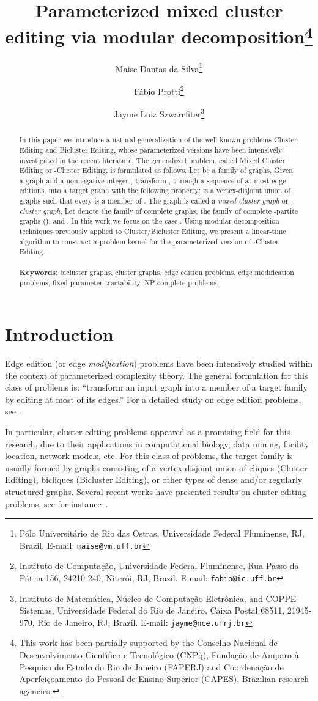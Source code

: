 \documentclass[12pt]{article}
\title{Parameterized mixed cluster editing via modular decomposition\footnote{This work has been partially supported by the
 Conselho Nacional de Desenvolvimento Cient\'{\i}fico e Tecnol\'{o}gico (CNPq), Funda\c c\~ao de Amparo \`a Pesquisa do
 Estado do Rio de Janeiro (FAPERJ) and Coordena\c c\~ao de Aperfei\c coamento do Pessoal de Ensino Superior (CAPES),
 Brazilian research agencies.}}
\author{Maise Dantas da Silva\footnote{P\'{o}lo Universit\'{a}rio de Rio das Ostras, Universidade Federal Fluminense, RJ, Brazil.
E-mail: {\tt maise@vm.uff.br}} \and F\'abio Protti\footnote{Instituto de Computa\c c\~ao, Universidade Federal Fluminense, Rua Passo da P\'{a}tria 156, 24210-240, Niter\'oi,
RJ, Brazil. E-mail: {\tt fabio@ic.uff.br}} \and  Jayme Luiz
Szwarcfiter\footnote{Instituto de Matem\'atica, N\'ucleo de
Computa\c c\~ao Eletr\^onica, and COPPE-Sistemas, Universidade
Federal do Rio de Janeiro, Caixa Postal 68511, 21945-970, Rio de
Janeiro, RJ, Brazil. E-mail: {\tt jayme@nce.ufrj.br}}}
\begin{document}
\newtheorem{teo}{Theorem}\newtheorem{lema}[teo]{Lemma}
\newtheorem{cor}[teo]{Corollary}
\newtheorem{prop}[teo]{Proposition}
\newtheorem{obs}[teo]{Remark}
\newtheorem{defin}[teo]{Definition}


\maketitle

\begin{abstract}

In this paper we introduce a natural generalization of the well-known problems {\sc Cluster Editing} and {\sc Bicluster Editing}, whose parameterized versions have been intensively investigated in the recent literature. The generalized problem, called {\sc Mixed Cluster Editing} or {\sc -Cluster Editing}, is formulated as follows. Let  be a family of graphs. Given a graph  and a nonnegative integer , transform , through a sequence of at most  edge editions, into a target graph  with the following property:  is a vertex-disjoint union of graphs  such that every  is a member of . The graph  is called a {\em mixed cluster graph} or {\em -cluster graph}. Let  denote the family of complete graphs,  the family of complete -partite graphs (), and
. In this work we focus on the case . Using modular decomposition techniques previously applied to {\sc Cluster/Bicluster Editing}, we present a linear-time algorithm to construct a problem kernel for the parameterized version of {\sc -Cluster Editing}.\\ \\
\textbf{Keywords}: bicluster graphs, cluster graphs, edge edition problems, edge modification problems, fixed-parameter tractability, NP-complete problems.
\end{abstract}

\section{Introduction} \label{sec1}

Edge edition (or edge {\em modification}) problems have been intensively studied within
the context of parameterized complexity theory. The general
formulation for this class of problems is: ``transform an input
graph  into a member of a target family
by editing at most  of its edges.'' For a detailed study on
edge edition problems, see \cite{NSS99}.

In particular, cluster editing problems appeared as a promising
field for this research, due to their applications in
computational biology, data mining, facility location, network
models, etc. For this class of problems, the target family
is usually formed by graphs consisting of a vertex-disjoint union
of cliques ({\sc Cluster Editing}), bicliques ({\sc Bicluster Editing}), or other types of dense and/or regularly structured
graphs. Several recent works have presented results on cluster editing problems,
see for instance~\cite{TBGEP2004,CM2011,DSPS2006,DSPS2009,FLRS2007,GGHN2003,G2007,YZ2007,SST2004}.
\end{document}
